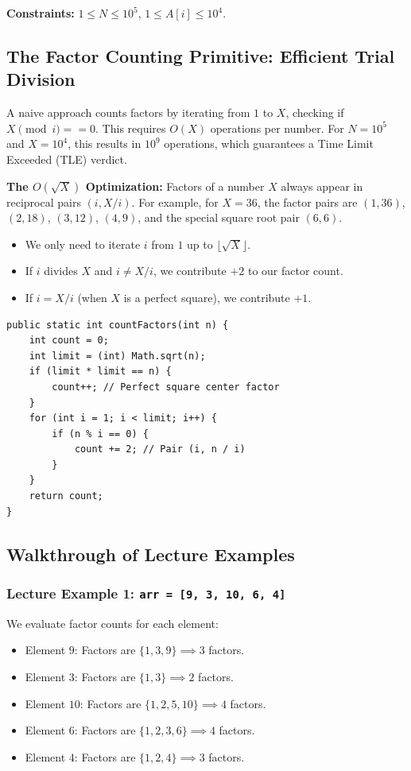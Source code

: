 \documentclass[10pt,journal,compsoc,onecolumn]{IEEEtran}
\begin{document}
\textbf{Constraints:} $1 \le N \le 10^5$, $1 \le A[i] \le 10^4$.

\subsection{The Factor Counting Primitive: Efficient Trial Division}

A naive approach counts factors by iterating from $1$ to $X$, checking if $X \pmod i == 0$. This requires $O(X)$ operations per number. For $N = 10^5$ and $X = 10^4$, this results in $10^9$ operations, which guarantees a Time Limit Exceeded (TLE) verdict.

\textbf{The $O(\sqrt{X})$ Optimization:} Factors of a number $X$ always appear in reciprocal pairs $(i, X/i)$. For example, for $X = 36$, the factor pairs are $(1, 36)$, $(2, 18)$, $(3, 12)$, $(4, 9)$, and the special square root pair $(6, 6)$.
\begin{itemize}
    \item We only need to iterate $i$ from $1$ up to $\lfloor\sqrt{X}\rfloor$.
    \item If $i$ divides $X$ and $i \neq X/i$, we contribute $+2$ to our factor count.
    \item If $i = X/i$ (when $X$ is a perfect square), we contribute $+1$.
\end{itemize}

\begin{verbatim}
public static int countFactors(int n) {
    int count = 0;
    int limit = (int) Math.sqrt(n);
    if (limit * limit == n) {
        count++; // Perfect square center factor
    }
    for (int i = 1; i < limit; i++) {
        if (n % i == 0) {
            count += 2; // Pair (i, n / i)
        }
    }
    return count;
}
\end{verbatim}

\subsection{Walkthrough of Lecture Examples}

\subsubsection{Lecture Example 1: \texttt{arr = [9, 3, 10, 6, 4]}}
We evaluate factor counts for each element:
\begin{itemize}
    \item Element $9$: Factors are $\{1, 3, 9\} \implies 3$ factors.
    \item Element $3$: Factors are $\{1, 3\} \implies 2$ factors.
    \item Element $10$: Factors are $\{1, 2, 5, 10\} \implies 4$ factors.
    \item Element $6$: Factors are $\{1, 2, 3, 6\} \implies 4$ factors.
    \item Element $4$: Factors are $\{1, 2, 4\} \implies 3$ factors.
\end{itemize}
\end{document}
